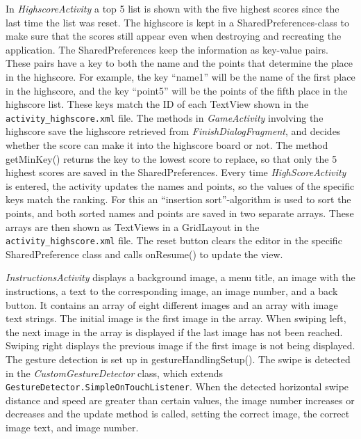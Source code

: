 In \emph{HighscoreActivity} a top 5 list is shown with the five highest scores since the last time the list was reset. The highscore is kept in a SharedPreferences-class to make sure that the scores still appear even when destroying and recreating the application. The SharedPreferences keep the information as key-value pairs. These pairs have a key to both the name and the points that determine the place in the highscore. For example, the key “name1” will be the name of the first place in the highscore, and the key “point5” will be the points of the fifth place in the highscore list. These keys match the ID of each TextView shown in the \verb|activity_highscore.xml| file. The methods in \emph{GameActivity} involving the highscore save the highscore retrieved from \emph{FinishDialogFragment}, and decides whether the score can make it into the highscore board or not. The method getMinKey() returns the key to the lowest score to replace, so that only the 5 highest scores are saved in the SharedPreferences. 
Every time \emph{HighScoreActivity} is entered, the activity updates the names and points, so the values of the specific keys match the ranking. For this an “insertion sort”-algorithm is used to sort the points, and both sorted names and points are saved in two separate arrays. These arrays are then shown as TextViews in a GridLayout in the \verb|activity_highscore.xml| file.
The reset button clears the editor in the specific SharedPreference class and calls onResume() to update the view.  \newline

\emph{InstructionsActivity} displays a background image, a menu title, an image with the instructions, a text to the corresponding image, an image number, and a back button. It contains an array of eight different images and an array with image text strings. The initial image is the first image in the array. When swiping left, the next image in the array is displayed if the last image has not been reached. Swiping right displays the previous image if the first image is not being displayed. The gesture detection is set up in gestureHandlingSetup(). The swipe is detected in the \emph{CustomGestureDetector} class, which extends \verb|GestureDetector.SimpleOnTouchListener|. When the detected horizontal swipe distance and speed are greater than certain values, the image number increases or decreases and the update method is called, setting the correct image, the correct image text, and image number. \newline

